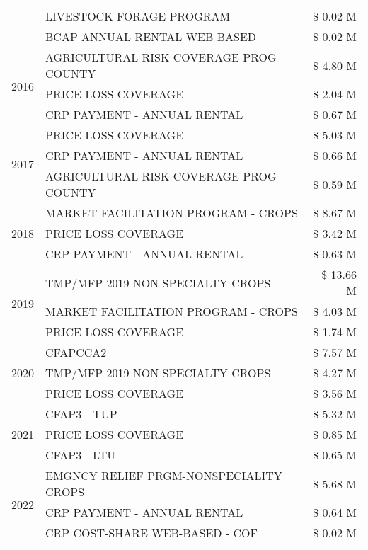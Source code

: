 \begin{tabular}{llr}
 & LIVESTOCK FORAGE PROGRAM & \$ 0.02 M \\
 & BCAP ANNUAL RENTAL WEB BASED & \$ 0.02 M \\
\cline{1-3}
\multirow[t]{3}{*}{2016} & AGRICULTURAL RISK COVERAGE PROG - COUNTY & \$ 4.80 M \\
 & PRICE LOSS COVERAGE & \$ 2.04 M \\
 & CRP PAYMENT - ANNUAL RENTAL & \$ 0.67 M \\
\cline{1-3}
\multirow[t]{3}{*}{2017} & PRICE LOSS COVERAGE & \$ 5.03 M \\
 & CRP PAYMENT - ANNUAL RENTAL & \$ 0.66 M \\
 & AGRICULTURAL RISK COVERAGE PROG - COUNTY & \$ 0.59 M \\
\cline{1-3}
\multirow[t]{3}{*}{2018} & MARKET FACILITATION PROGRAM - CROPS & \$ 8.67 M \\
 & PRICE LOSS COVERAGE & \$ 3.42 M \\
 & CRP PAYMENT - ANNUAL RENTAL & \$ 0.63 M \\
\cline{1-3}
\multirow[t]{3}{*}{2019} & TMP/MFP 2019 NON SPECIALTY CROPS & \$ 13.66 M \\
 & MARKET FACILITATION PROGRAM - CROPS & \$ 4.03 M \\
 & PRICE LOSS COVERAGE & \$ 1.74 M \\
\cline{1-3}
\multirow[t]{3}{*}{2020} & CFAPCCA2 & \$ 7.57 M \\
 & TMP/MFP 2019 NON SPECIALTY CROPS & \$ 4.27 M \\
 & PRICE LOSS COVERAGE & \$ 3.56 M \\
\cline{1-3}
\multirow[t]{3}{*}{2021} & CFAP3 - TUP & \$ 5.32 M \\
 & PRICE LOSS COVERAGE & \$ 0.85 M \\
 & CFAP3 - LTU & \$ 0.65 M \\
\cline{1-3}
\multirow[t]{3}{*}{2022} & EMGNCY RELIEF PRGM-NONSPECIALITY CROPS & \$ 5.68 M \\
 & CRP PAYMENT - ANNUAL RENTAL & \$ 0.64 M \\
 & CRP COST-SHARE WEB-BASED - COF & \$ 0.02 M \\
\cline{1-3}
\bottomrule
\end{tabular}

